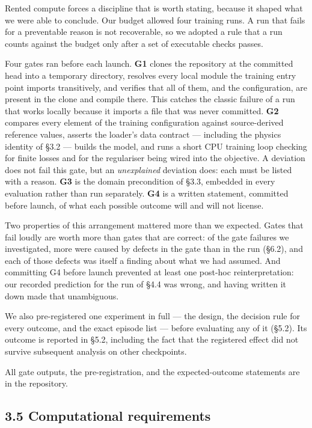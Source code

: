 \documentclass[10pt]{article}
\begin{document}
Rented compute forces a discipline that is worth stating, because it shaped what
we were able to conclude. Our budget allowed four training runs. A run that
fails for a preventable reason is not recoverable, so we adopted a rule that a
run counts against the budget only after a set of executable checks passes.

Four gates ran before each launch. \textbf{G1} clones the repository at the committed
head into a temporary directory, resolves every local module the training entry
point imports transitively, and verifies that all of them, and the configuration,
are present in the clone and compile there. This catches the classic failure of
a run that works locally because it imports a file that was never committed.
\textbf{G2} compares every element of the training configuration against
source-derived reference values, asserts the loader's data contract --- including
the physics identity of \S{}3.2 --- builds the model, and runs a short CPU training
loop checking for finite losses and for the regulariser being wired into the
objective. A deviation does not fail this gate, but an \emph{unexplained} deviation
does: each must be listed with a reason. \textbf{G3} is the domain precondition of
\S{}3.3, embedded in every evaluation rather than run separately. \textbf{G4} is a
written statement, committed before launch, of what each possible outcome will
and will not license.

Two properties of this arrangement mattered more than we expected. Gates that
fail loudly are worth more than gates that are correct: of the gate failures we
investigated, more were caused by defects in the gate than in the run (\S{}6.2),
and each of those defects was itself a finding about what we had assumed. And
committing G4 before launch prevented at least one post-hoc reinterpretation: our
recorded prediction for the run of \S{}4.4 was wrong, and having written it down
made that unambiguous.

We also pre-registered one experiment in full --- the design, the decision rule for
every outcome, and the exact episode list --- before evaluating any of it (\S{}5.2).
Its outcome is reported in \S{}5.2, including the fact that the registered effect
did not survive subsequent analysis on other checkpoints.

All gate outputs, the pre-registration, and the expected-outcome statements are
in the repository.

\subsection{3.5 Computational requirements}\label{computational-requirements}
\end{document}
